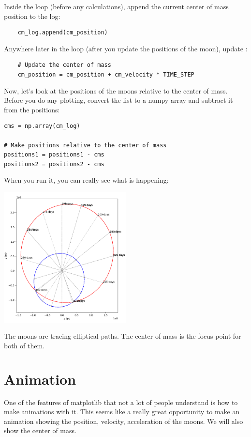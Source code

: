 Inside the loop (before any calculations),  append the current center of mass position to the log:

\begin{verbatim}
    cm_log.append(cm_position)
\end{verbatim}

Anywhere later in the loop (after you update the positions of the moon),  update :

\begin{verbatim}
    # Update the center of mass
    cm_position = cm_position + cm_velocity * TIME_STEP
\end{verbatim}

Now, let's look at the positions of the moons relative to the center of mass.   Before you do any plotting,  
convert the list to a numpy array and subtract it from the positions:

\begin{verbatim}
cms = np.array(cm_log)

# Make positions relative to the center of mass
positions1 = positions1 - cms
positions2 = positions2 - cms
\end{verbatim}

When you run it, you can really see what is happening:

\includegraphics[width=0.5\textwidth]{plotmoons_04.png}

The moons are tracing elliptical paths.  The center of mass is the focus point for both of them.

\section{Animation}

One of the features of matplotlib that not a lot of people understand is how to make animations with it.  This
seems like a really great opportunity to make an animation showing the position, velocity, acceleration of the moons.  We will also show the center of mass.

